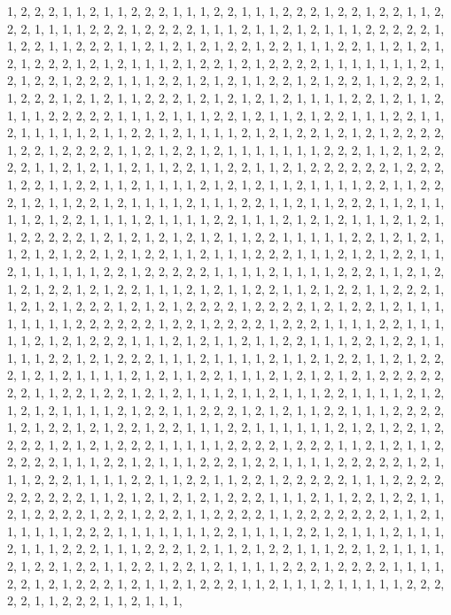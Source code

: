 \documentclass[
]{article}
\begin{document}
\begin{Schunk}
\begin{Soutput}
1, 2, 2, 2, 1, 1, 2, 1, 1, 2, 2, 2, 1, 1, 1, 2, 2, 1, 1, 1, 2, 2, 2, 1, 2, 2, 1, 2, 2, 1, 1, 2, 2, 2, 1, 1, 1, 1, 2, 2, 2, 1, 2, 2, 2, 2, 1, 1, 1, 2, 1, 1, 2, 1, 2, 1, 1, 1, 2, 2, 2, 2, 2, 1, 1, 2, 2, 1, 1, 2, 2, 2, 1, 1, 2, 1, 2, 1, 2, 1, 2, 2, 1, 2, 2, 1, 1, 1, 2, 2, 1, 1, 2, 1, 2, 1, 2, 1, 2, 2, 2, 1, 2, 1, 2, 1, 1, 1, 2, 1, 2, 2, 1, 2, 1, 2, 2, 2, 2, 1, 1, 1, 1, 1, 1, 1, 2, 1, 2, 1, 2, 2, 1, 2, 2, 2, 1, 1, 1, 2, 2, 1, 2, 1, 2, 1, 1, 2, 2, 1, 2, 1, 2, 2, 1, 1, 2, 2, 2, 1, 1, 2, 2, 2, 1, 2, 1, 2, 1, 1, 2, 2, 2, 1, 2, 1, 2, 1, 2, 1, 2, 1, 1, 1, 1, 2, 2, 1, 2, 1, 1, 2, 1, 1, 1, 2, 2, 2, 2, 2, 1, 1, 1, 2, 1, 1, 1, 2, 2, 1, 2, 1, 1, 2, 1, 2, 2, 1, 1, 1, 2, 2, 1, 1, 2, 1, 1, 1, 1, 1, 2, 1, 1, 2, 2, 1, 2, 1, 1, 1, 1, 2, 1, 2, 1, 2, 2, 1, 2, 1, 2, 1, 2, 2, 2, 2, 1, 2, 2, 1, 2, 2, 2, 2, 1, 1, 2, 1, 2, 2, 1, 2, 1, 1, 1, 1, 1, 1, 1, 2, 2, 2, 1, 1, 2, 1, 2, 2, 2, 2, 1, 1, 2, 1, 2, 1, 1, 2, 1, 1, 2, 2, 1, 1, 2, 2, 1, 1, 2, 1, 2, 2, 2, 2, 2, 2, 1, 2, 2, 2, 1, 2, 2, 1, 1, 2, 2, 1, 1, 2, 1, 1, 1, 1, 2, 1, 2, 1, 2, 1, 1, 2, 1, 1, 1, 1, 2, 2, 1, 1, 2, 2, 2, 1, 2, 1, 1, 2, 2, 1, 2, 1, 1, 1, 1, 2, 1, 1, 1, 2, 2, 1, 1, 2, 1, 1, 2, 2, 2, 1, 1, 2, 1, 1, 1, 1, 2, 1, 2, 2, 1, 1, 1, 1, 2, 1, 1, 1, 1, 2, 2, 1, 1, 1, 2, 1, 2, 1, 2, 1, 1, 1, 2, 1, 2, 1, 1, 2, 2, 2, 2, 2, 1, 2, 1, 2, 1, 2, 1, 2, 1, 2, 1, 1, 2, 2, 1, 1, 1, 1, 1, 2, 2, 1, 2, 1, 2, 1, 1, 2, 1, 2, 1, 2, 2, 1, 2, 1, 2, 2, 1, 1, 2, 1, 1, 1, 2, 2, 2, 1, 1, 1, 2, 1, 2, 1, 2, 2, 1, 1, 2, 1, 1, 1, 1, 1, 1, 2, 2, 1, 2, 2, 2, 2, 2, 1, 1, 1, 1, 2, 1, 1, 1, 1, 2, 2, 2, 1, 1, 2, 1, 2, 1, 2, 1, 2, 2, 1, 2, 1, 2, 2, 1, 1, 1, 2, 1, 2, 1, 1, 2, 2, 1, 1, 2, 1, 2, 2, 1, 1, 2, 2, 2, 1, 1, 2, 1, 2, 1, 2, 2, 2, 1, 2, 1, 2, 1, 2, 2, 2, 2, 1, 2, 2, 2, 2, 1, 2, 1, 2, 2, 1, 2, 1, 1, 1, 1, 1, 1, 1, 1, 2, 2, 2, 2, 2, 2, 1, 2, 2, 1, 2, 2, 2, 2, 1, 2, 2, 2, 1, 1, 1, 1, 2, 2, 1, 1, 1, 1, 1, 2, 1, 2, 1, 2, 2, 2, 1, 1, 1, 2, 1, 2, 1, 1, 2, 1, 1, 2, 2, 1, 1, 1, 2, 2, 1, 2, 2, 1, 1, 1, 1, 1, 2, 2, 1, 2, 1, 2, 2, 2, 1, 1, 1, 2, 1, 1, 1, 1, 2, 1, 1, 2, 1, 2, 2, 1, 1, 2, 1, 2, 2, 2, 1, 2, 1, 2, 1, 1, 1, 1, 2, 1, 2, 1, 1, 2, 2, 1, 1, 1, 2, 1, 2, 1, 2, 1, 2, 1, 2, 2, 2, 2, 2, 2, 2, 1, 1, 2, 2, 1, 2, 2, 1, 2, 1, 2, 1, 1, 1, 2, 1, 1, 2, 1, 1, 1, 2, 2, 1, 1, 1, 1, 2, 1, 2, 1, 2, 1, 2, 1, 1, 1, 1, 2, 1, 2, 2, 1, 1, 2, 2, 2, 1, 2, 1, 2, 1, 1, 2, 2, 1, 1, 1, 2, 2, 2, 2, 1, 2, 1, 2, 2, 1, 2, 1, 2, 2, 1, 2, 2, 1, 1, 1, 2, 2, 1, 1, 1, 1, 1, 1, 2, 1, 2, 1, 2, 2, 1, 2, 2, 2, 2, 1, 2, 1, 2, 1, 2, 2, 2, 1, 1, 1, 1, 1, 2, 2, 2, 2, 1, 2, 2, 2, 1, 1, 2, 1, 2, 1, 1, 2, 2, 2, 2, 2, 1, 1, 1, 2, 2, 1, 2, 1, 1, 1, 2, 2, 2, 1, 2, 2, 1, 1, 1, 1, 2, 2, 2, 2, 2, 1, 2, 1, 1, 1, 2, 2, 2, 1, 1, 1, 1, 2, 2, 1, 1, 2, 2, 1, 1, 2, 2, 1, 2, 2, 2, 2, 2, 1, 1, 1, 2, 2, 2, 2, 2, 2, 2, 2, 2, 2, 1, 1, 2, 1, 2, 1, 2, 1, 2, 1, 2, 2, 2, 1, 1, 1, 2, 1, 1, 2, 2, 1, 2, 2, 1, 1, 2, 1, 2, 2, 2, 2, 1, 2, 2, 1, 2, 2, 2, 1, 1, 2, 2, 2, 2, 1, 1, 2, 2, 2, 2, 2, 2, 2, 1, 1, 2, 1, 1, 1, 1, 1, 1, 2, 2, 2, 1, 1, 1, 1, 1, 1, 1, 2, 2, 1, 1, 1, 1, 2, 2, 1, 2, 1, 1, 1, 2, 1, 1, 1, 2, 1, 1, 1, 2, 2, 2, 1, 1, 1, 2, 2, 2, 1, 2, 1, 1, 2, 1, 2, 2, 1, 1, 1, 2, 2, 1, 2, 1, 1, 1, 1, 2, 1, 2, 2, 1, 2, 2, 1, 1, 2, 2, 1, 2, 2, 1, 2, 1, 1, 1, 1, 2, 2, 2, 1, 2, 2, 2, 2, 1, 1, 1, 1, 2, 2, 1, 2, 1, 2, 2, 2, 1, 2, 1, 1, 2, 1, 2, 2, 2, 1, 1, 2, 1, 1, 1, 2, 1, 1, 1, 1, 1, 2, 2, 2, 2, 2, 1, 1, 2, 2, 2, 1, 1, 2, 1, 1, 1, 
\end{Soutput}
\end{Schunk}
\end{document}

